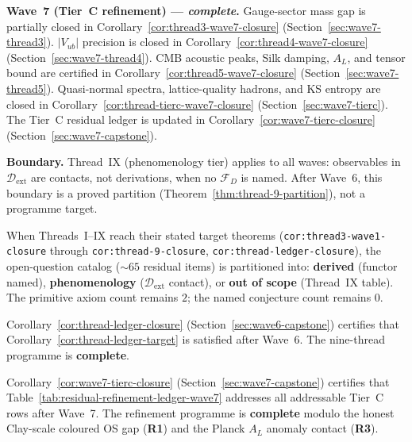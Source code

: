 \medskip
\noindent\textbf{Wave~7 (Tier~C refinement) --- \emph{complete}.}
Gauge-sector mass gap is partially closed in
Corollary~\ref{cor:thread3-wave7-closure}
(Section~\ref{sec:wave7-thread3}).
$|V_{ub}|$ precision is closed in
Corollary~\ref{cor:thread4-wave7-closure}
(Section~\ref{sec:wave7-thread4}).
CMB acoustic peaks, Silk damping, $A_L$, and tensor bound are certified in
Corollary~\ref{cor:thread5-wave7-closure}
(Section~\ref{sec:wave7-thread5}).
Quasi-normal spectra, lattice-quality hadrons, and KS entropy are closed in
Corollary~\ref{cor:thread-tierc-wave7-closure}
(Section~\ref{sec:wave7-tierc}).
The Tier~C residual ledger is updated in
Corollary~\ref{cor:wave7-tierc-closure}
(Section~\ref{sec:wave7-capstone}).

\medskip
\noindent\textbf{Boundary.}
Thread~IX (phenomenology tier) applies to all waves: observables in
$\mathcal{D}_{\mathrm{ext}}$ are contacts, not derivations, when no
$\mathcal{F}_D$ is named. After Wave~6, this boundary is a proved partition
(Theorem~\ref{thm:thread-9-partition}), not a programme target.

\begin{corollary}\label{cor:thread-ledger-target}
When Threads~I--IX reach their stated target theorems
(\texttt{cor:thread3-wave1-closure} through \texttt{cor:thread-9-closure},
\texttt{cor:thread-ledger-closure}), the open-question catalog
($\sim 65$ residual items) is partitioned into: \textbf{derived} (functor
named), \textbf{phenomenology} ($\mathcal{D}_{\mathrm{ext}}$ contact), or
\textbf{out of scope} (Thread~IX table). The primitive axiom count remains
$2$; the named conjecture count remains $0$.
\end{corollary}

\begin{corollary}\label{cor:thread-ledger-closure-forward}
Corollary~\ref{cor:thread-ledger-closure} (Section~\ref{sec:wave6-capstone})
certifies that Corollary~\ref{cor:thread-ledger-target} is satisfied after
Wave~6. The nine-thread programme is \textbf{complete}.
\end{corollary}

\begin{corollary}\label{cor:wave7-tierc-closure-forward}
Corollary~\ref{cor:wave7-tierc-closure} (Section~\ref{sec:wave7-capstone})
certifies that Table~\ref{tab:residual-refinement-ledger-wave7} addresses all
addressable Tier~C rows after Wave~7. The refinement programme is \textbf{complete}
modulo the honest Clay-scale coloured OS gap (\textbf{R1}) and the Planck
$A_L$ anomaly contact (\textbf{R3}).
\end{corollary}